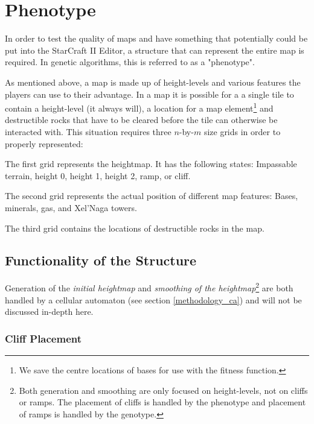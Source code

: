 \section{Phenotype}
\label{methodology_phenotype}

In order to test the quality of maps and have something that potentially could be put into the StarCraft II Editor, a structure that can represent the entire map is required. In genetic algorithms, this is referred to as a "phenotype".

As mentioned above, a map is made up of height-levels and various features the players can use to their advantage. In a map it is possible for a a single tile to contain a height-level (it always will), a location for a map element\footnote{We save the centre locations of bases for use with the fitness function.} and destructible rocks that have to be cleared before the tile can otherwise be interacted with. This situation requires three $n$-by-$m$ size grids in order to properly represented:

\begin{my_itemize}

	\item The first grid represents the heightmap. It has the following states: Impassable terrain, height 0, height 1, height 2, ramp, or cliff.

	\item The second grid represents the actual position of different map features: Bases, minerals, gas, and Xel'Naga towers.

	\item The third grid contains the locations of destructible rocks in the map.

\end{my_itemize}

\subsection{Functionality of the Structure}
\label{methodology_phenotype_functionality}

Generation of the \textit{initial heightmap} and \textit{smoothing of the heightmap}\footnote{Both generation and smoothing are only focused on height-levels, not on cliffs or ramps. The placement of cliffs is handled by the phenotype and placement of ramps is handled by the genotype.} are both handled by a cellular automaton (see section \ref{methodology_ca}) and will not be discussed in-depth here.

\subsubsection*{Cliff Placement}

